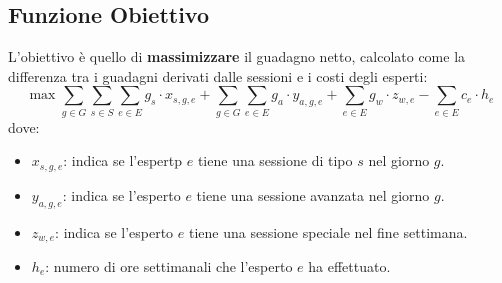\documentclass[12pt]{article}
\begin{document}
    \subsection{Funzione Obiettivo}
    L'obiettivo è quello di \textbf{massimizzare} il guadagno netto, calcolato come la differenza tra i guadagni derivati dalle sessioni e i costi degli esperti:
    \begin{equation}
        \max \sum_{g \in G}\sum_{s \in S}\sum_{e \in E} g_s \cdot x_{s,g,e} + \sum_{g \in G}\sum_{e \in E} g_a \cdot y_{a,g,e} + \sum_{e \in E} g_w \cdot z_{w,e} - \sum_{e \in E} c_e \cdot h_e
    \end{equation}
    dove:
    \begin{itemize}
        \item $x_{s,g,e}$: indica se l'espertp $e$ tiene una sessione di tipo $s$ nel giorno $g$.
        \item $y_{a,g,e}$: indica se l'esperto $e$ tiene una sessione avanzata nel giorno $g$.
        \item $z_{w,e}$: indica se l'esperto $e$ tiene una sessione speciale nel fine settimana.
        \item $h_e$: numero di ore settimanali che l'esperto $e$ ha effettuato.
    \end{itemize}
    
\end{document}
